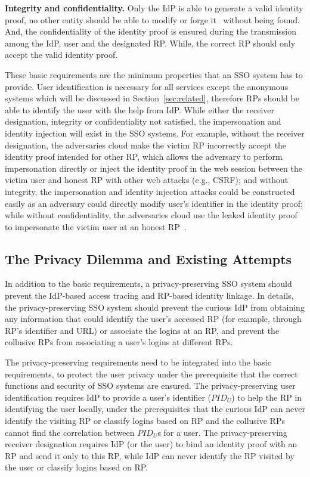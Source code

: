\vspace{1mm}\noindent\textbf{Integrity and confidentiality.} Only the IdP is able to generate a valid identity proof,
     no other entity should be able to modify or forge it~\cite{WangZLG16} without being found. And, the confidentiality of the identity proof is ensured during the transmission among the IdP, user and the designated RP. While, the correct RP should only accept the valid identity proof.


These basic requirements are the minimum properties that an SSO system has to provide.
User identification is necessary for all services except the anonymous systems which will be discussed in Section~\ref{sec:related},
 therefore RPs should be able to identify the user with the help from IdP.
While either the receiver designation, integrity or confidentiality not satisfied, the impersonation and identity injection will exist in the SSO systems.
For example, without the receiver designation, the adversaries cloud make the victim RP  incorrectly accept the identity proof intended for other RP, which allows the adversary to perform impersonation directly or inject the identity proof in the web session between the victim user and honest RP with other web attacks (e.g., CSRF); and without integrity, the impersonation and identity injection attacks could be constructed easily  as an adversary could directly modify user's identifier in the identity proof; while without confidentiality, the adversaries cloud use the leaked identity proof to impersonate the victim user at an honest RP~\cite{ChenPCTKT14,FettKS16,WangZLG16}.



\subsection{The Privacy Dilemma and Existing Attempts}
\label{subsec:challenges}
In addition to the basic requirements, a privacy-preserving SSO system should prevent the IdP-based access tracing %
and RP-based identity linkage.
In details, the privacy-preserving SSO system should prevent the curious IdP from obtaining any information that could identify the user's accessed RP (for example, through RP's identifier and URL) or associate the logins at an RP,
and prevent  the collusive RPs from associating a user's logins at different RPs.

The privacy-preserving requirements need to be integrated into the basic requirements, to protect the user privacy under the prerequisite that the correct functions and security of SSO systems are ensured.
The privacy-preserving user identification requires IdP to provide a user's identifier ($PID_U$) to help the RP in identifying the user locally,
 under the prerequisites that the curious IdP can never identify the visiting RP or classify logins based on RP and the collusive RPs cannot find the correlation between $PID_U$s for a user.
The privacy-preserving receiver designation requires IdP (or the user) to bind an identity proof with an RP and send it only to this RP,
 while IdP can never identify the RP visited by the user or classify logins based on RP.

